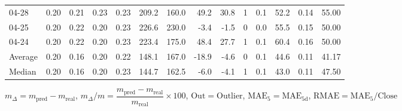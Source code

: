\begin{threeparttable}
{\begin{tabular}{lrrrrrrrrrrrrr}
  04-28 &          0.20 &          0.21 &          0.23 &        0.23 &               209.2 &               160.0 &       49.2 &         30.8 &              1 &                 0.1 &             52.2 &            0.14 &                  55.00 \\
  04-25 &          0.20 &          0.22 &          0.20 &        0.23 &               226.6 &               230.0 &       -3.4 &         -1.5 &              0 &                 0.0 &             55.5 &            0.15 &                  50.00 \\
  04-24 &          0.20 &          0.22 &          0.20 &        0.23 &               223.4 &               175.0 &       48.4 &         27.7 &              1 &                 0.1 &             60.4 &            0.16 &                  50.00 \\
Average &          0.20 &          0.16 &          0.20 &        0.22 &               148.1 &               167.0 &      -18.9 &         -4.6 &              0 &                 0.1 &             44.6 &            0.11 &                  41.17 \\
 Median &          0.20 &          0.16 &          0.20 &        0.23 &               144.7 &               162.5 &       -6.0 &         -4.1 &              1 &                 0.1 &             43.0 &            0.11 &                  47.50 \\
\bottomrule
\end{tabular}
}
\begin{tablenotes}\footnotesize
\item $m_\Delta=m_{\text{pred}}-m_{\text{real}}$,
$m_\Delta/m=\dfrac{m_{\text{pred}}-m_{\text{real}}}{m_{\text{real}}}\times100$,
$\mathrm{Out}=\text{Outlier}$,
$\mathrm{MAE}_5=\mathrm{MAE}_{5\text{d}}$,
$\mathrm{RMAE}=\mathrm{MAE}_5/\text{Close}$
\end{tablenotes}
\end{threeparttable}
\endgroup

